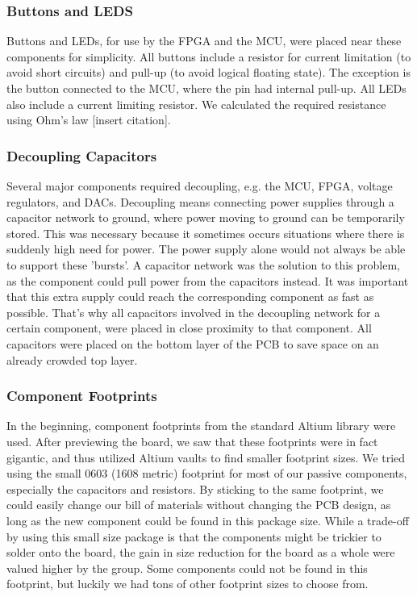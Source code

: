 \subsubsection{Buttons and LEDS}
Buttons and LEDs, for use by the FPGA and the MCU, were placed near these components for simplicity. All buttons include a resistor for current limitation (to avoid short circuits) and pull-up (to avoid logical floating state). The exception is the button connected to the MCU, where the pin had internal pull-up. All LEDs also include a current limiting resistor. We calculated the required resistance using Ohm's law [insert citation].

\subsubsection{Decoupling Capacitors}
Several major components required decoupling, e.g. the MCU, FPGA, voltage regulators, and DACs. Decoupling means connecting power supplies through a capacitor network to ground, where power moving to ground can be temporarily stored. This was necessary because it sometimes occurs situations where there is suddenly high need for power. The power supply alone would not always be able to support these 'bursts'. A capacitor network was the solution to this problem, as the component could pull power from the capacitors instead.
\newline
It was important that this extra supply could reach the corresponding component as fast as possible. That's why all capacitors involved in the decoupling network for a certain component, were placed in close proximity to that component. All capacitors were placed on the bottom layer of the PCB to save space on an already crowded top layer.

\subsubsection{Component Footprints}
In the beginning, component footprints from the standard Altium library were used. After previewing the board, we saw that these footprints were in fact gigantic, and thus utilized Altium vaults to find smaller footprint sizes. We tried using the small 0603 (1608 metric) footprint for most of our passive components, especially the capacitors and resistors. By sticking to the same footprint, we could easily change our bill of materials without changing the PCB design, as long as the new component could be found in this package size. While a trade-off by using this small size package is that the components might be trickier to solder onto the board, the gain in size reduction for the board as a whole were valued higher by the group. Some components could not be found in this footprint, but luckily we had tons of other footprint sizes to choose from.


